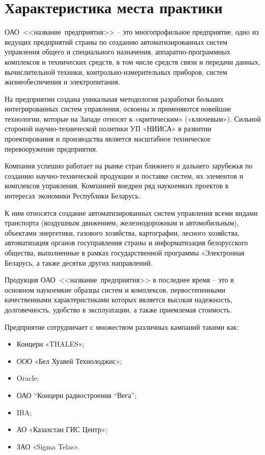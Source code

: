 \section{Характеристика места практики}
\label{sec:practice:characteristics}
\newcommand{\company}{\mbox{<<название предприятия>>}}


ОАО~\company{} – это многопрофильное предприятие, одно из ведущих предприятий страны по созданию автоматизированных систем управления общего и специального назначения, аппаратно-программных комплексов и технических средств, в том числе средств связи и передачи данных, вычислительной техники, контрольно-измерительных приборов, систем жизнеобеспечения и электропитания.

На предприятии создана уникальная методология разработки больших интегрированных систем управления, освоены и применяются новейшие технологии, которые на Западе относят к «критическим» («ключевым»). Сильной стороной научно-технической политики УП «НИИСА» в развитии проектирования и производства является масштабное техническое перевооружение предприятия.

Компания успешно работает на рынке стран ближнего и дальнего зарубежья по созданию научно-технической продукции и поставке систем, их элементов и комплексов управления. Компанией внедрен ряд наукоемких проектов в интересах экономики Республики Беларусь.

К ним относятся создание автоматизированных систем управления всеми видами транспорта (воздушным движением, железнодорожным и автомобильным), объектами энергетики, газового хозяйства, картографии, лесного хозяйства, автоматизация органов госуправления страны и информатизация белорусского общества, выполненные в рамках государственной программы «Электронная Беларусь, а также десятки других направлений.

Продукция ОАО~\company{} в последнее время – это в основном наукоемкие образцы систем и комплексов, первостепенными качественными характеристиками которых является высокая надежность, долговечность, удобство в эксплуатации, а также приемлемая стоимость.

Предприятие сотрудничает с множеством различных кампаний такими как:

\begin{itemize}
  \item Концерн «THALES»;
  \item ООО «Бел Хуавей Технолоджис»;
  \item Oracle;
  \item ОАО “Концерн радиостроения “Вега”;
  \item IBA;
  \item АО «Казахстан ГИС Центр»;

  \item ЗАО «Sigma Telas».

 
\end{itemize}